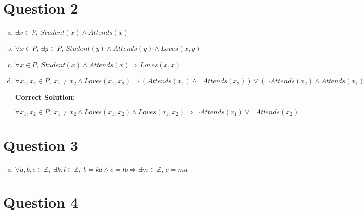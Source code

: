 \documentclass[12pt]{article}
\begin{document}
\section*{Question 2}
\begin{enumerate}[a.]
    \item

    $\exists x \in P,\: Student(x) \land Attends(x)$

    \item

    $\forall x \in P,\:\exists y \in P,\:Student(y) \land Attends(y) \land Loves(x,y)$

    \item

    $\forall x \in P,\: Student(x) \land Attends(x) \Rightarrow Loves(x,x)$

    \item

    $\forall x_1,x_2 \in P,\:x_1 \neq x_2 \land Loves(x_1,x_2) \Rightarrow
    (Attends(x_1) \land \neg Attends(x_2)) \lor (\neg Attends(x_2) \land Attends(x_1))$

    \bigskip

    \textbf{Correct Solution:}

    $\forall x_1,x_2 \in P,\:x_1 \neq x_2 \land Loves(x_1,x_2) \land Loves(x_1,x_2) \Rightarrow
    \neg Attends(x_1) \lor \neg Attends(x_2)$


\end{enumerate}

\section*{Question 3}
\begin{enumerate}[a.]
    \item

    $\forall a,b,c \in \mathbb{Z},\:\exists k,l \in \mathbb{Z},\:b = ka \land c = lb
    \Rightarrow \exists m \in \mathbb{Z},\:c = ma$

\end{enumerate}

\section*{Question 4}
\end{document}
